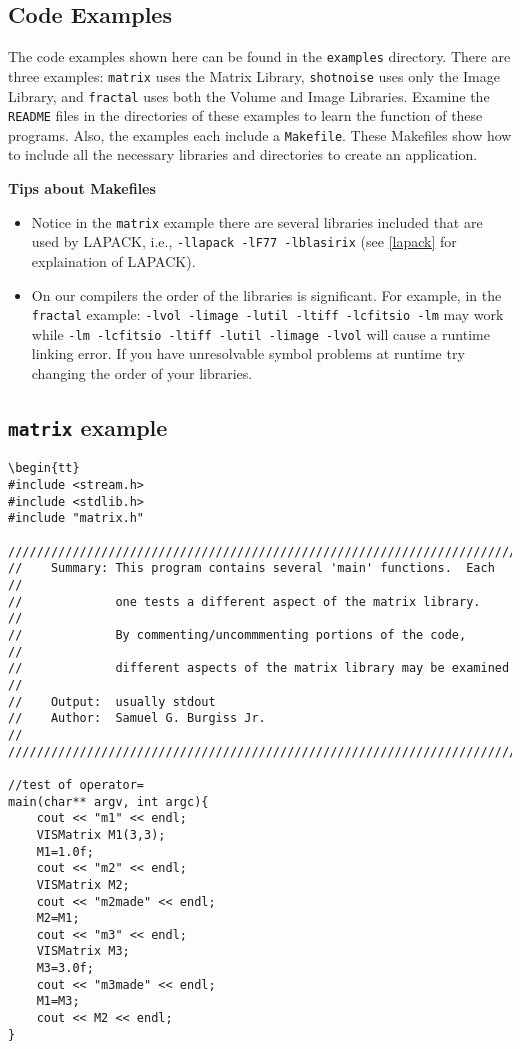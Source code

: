\begin{appendix}
\section{Code Examples}
The code examples shown here can be found in the {\tt examples} directory.
There are three examples:  {\tt matrix} uses the Matrix Library,
{\tt shotnoise} uses only the Image Library, and {\tt fractal} uses both
the Volume and Image Libraries.  Examine the {\tt README} files in
the directories of these examples to learn the function of these programs.
Also, the examples each include a {\tt Makefile}.  These Makefiles
show how to include all the necessary libraries and directories
to create an application.

{\bf Tips about Makefiles}
\begin{itemize}
\item Notice in the {\tt matrix} example there are several libraries included
that are used by LAPACK, i.e., {\tt -llapack -lF77 -lblasirix}
(see \ref{lapack} for explaination of LAPACK).
\item On our compilers the order of the libraries is significant.
For example, in the {\tt fractal} example:
{\tt -lvol -limage -lutil -ltiff -lcfitsio -lm} may work while
{\tt -lm -lcfitsio -ltiff -lutil -limage -lvol} will cause a runtime
linking error.  If you have unresolvable symbol problems at runtime
try changing the order of your libraries.
\end{itemize}
 

\subsection{{\tt matrix} example}
\begin{verbatim}
\begin{tt}
#include <stream.h>
#include <stdlib.h>
#include "matrix.h"

/////////////////////////////////////////////////////////////////////////
//    Summary: This program contains several 'main' functions.  Each   //
//             one tests a different aspect of the matrix library.     //
//             By commenting/uncommmenting portions of the code,       //
//             different aspects of the matrix library may be examined //
//    Output:  usually stdout
//    Author:  Samuel G. Burgiss Jr.                                   //
/////////////////////////////////////////////////////////////////////////

//test of operator=
main(char** argv, int argc){
    cout << "m1" << endl;
    VISMatrix M1(3,3);
    M1=1.0f;
    cout << "m2" << endl;
    VISMatrix M2;
    cout << "m2made" << endl;
    M2=M1;
    cout << "m3" << endl;
    VISMatrix M3;
    M3=3.0f;
    cout << "m3made" << endl;
    M1=M3;
    cout << M2 << endl;
}


\end{verbatim}
\end{appendix}
